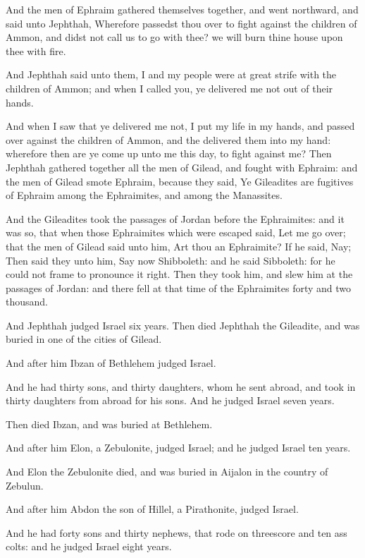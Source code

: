 \Chapter
\Verse And the men of Ephraim gathered themselves together, and went northward, and said unto Jephthah, Wherefore passedst thou over to fight against the children of Ammon, and didst not call us to go with thee? we will burn thine house upon thee with fire.

\Verse And Jephthah said unto them, I and my people were at great strife with the children of Ammon; and when I called you, ye delivered me not out of their hands.

\Verse And when I saw that ye delivered me not, I put my life in my hands, and passed over against the children of Ammon, and the \LORD delivered them into my hand: wherefore then are ye come up unto me this day, to fight against me?  \Verse Then Jephthah gathered together all the men of Gilead, and fought with Ephraim: and the men of Gilead smote Ephraim, because they said, Ye Gileadites are fugitives of Ephraim among the Ephraimites, and among the Manassites.

\Verse And the Gileadites took the passages of Jordan before the Ephraimites: and it was so, that when those Ephraimites which were escaped said, Let me go over; that the men of Gilead said unto him, Art thou an Ephraimite? If he said, Nay; \Verse Then said they unto him, Say now Shibboleth: and he said Sibboleth: for he could not frame to pronounce it right. Then they took him, and slew him at the passages of Jordan: and there fell at that time of the Ephraimites forty and two thousand.

\Verse And Jephthah judged Israel six years. Then died Jephthah the Gileadite, and was buried in one of the cities of Gilead.

\Verse And after him Ibzan of Bethlehem judged Israel.

\Verse And he had thirty sons, and thirty daughters, whom he sent abroad, and took in thirty daughters from abroad for his sons. And he judged Israel seven years.

\Verse Then died Ibzan, and was buried at Bethlehem.

\Verse And after him Elon, a Zebulonite, judged Israel; and he judged Israel ten years.

\Verse And Elon the Zebulonite died, and was buried in Aijalon in the country of Zebulun.

\Verse And after him Abdon the son of Hillel, a Pirathonite, judged Israel.

\Verse And he had forty sons and thirty nephews, that rode on threescore and ten ass colts: and he judged Israel eight years.

